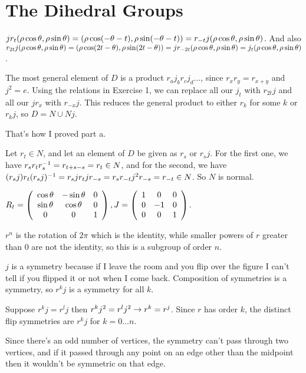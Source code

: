 \documentclass[11pt, oneside]{article}   	%
\begin{document}
\section{The Dihedral Groups}
\be
\item $jr_t(\rho\cos\theta, \rho\sin\theta) = (\rho\cos(-\theta - t), \rho\sin(-\theta - t)) = r_{-t}j(\rho\cos\theta, \rho\sin\theta)$. And also $r_{2t}j(\rho\cos\theta, \rho\sin\theta) = (\rho\cos(2t - \theta), \rho\sin(2t - \theta)) = jr_{-2t}(\rho\cos\theta, \rho\sin\theta) = j_t(\rho\cos\theta, \rho\sin\theta)$. 
\item \be
\item The most general element of $D$ is a product $r_aj_br_cj_d\ldots$, since $r_xr_y = r_{x + y}$ and $j^2 = e$. Using the relations in Exercise 1, we can replace all our $j_t$ with $r_{2t}j$ and all our $jr_x$ with $r_{-x}j$. This reduces the general product to either $r_k$ for some $k$ or $r_kj$, so $D = N \cup Nj$.
\item That's how I proved part a.
\item Let $r_t \in N$, and let an element of $D$ be given as $r_s$ or $r_sj$. For the first one, we have $r_sr_tr_s^{-1} = r_{t + s - s} = r_t \in N$, and for the second, we have $(r_sj)r_t(r_sj)^{-1} = r_sjr_tjr_{-s} = r_sr_{-t}j^2r_{-s} = r_{-t} \in N$. So $N$ is normal.
\ee 
\item $R_t =\left( \begin{array}{ccc} \cos\theta & -\sin\theta & 0 \\ \sin\theta & \cos\theta & 0 \\ 0 & 0 & 1 \end{array} \right), J = \left( \begin{array}{ccc} 1 & 0 & 0 \\ 0 & -1 & 0 \\ 0 & 0 & 1 \end{array} \right)$.
\item \be
\item $r^n$ is the rotation of $2\pi$ which is the identity, while smaller powers of $r$ greater than 0 are not the identity, so this is a subgroup of order $n$.
\item $j$ is a symmetry because if I leave the room and you flip over the figure I can't tell if you flipped it or not when I come back. Composition of symmetries is a symmetry, so $r^kj$ is a symmetry for all $k$.
\item Suppose $r^kj = r^lj$ then $r^kj^2 = r^lj^2 \rightarrow r^k = r^j$. Since $r$ has order $k$, the distinct flip symmetries are $r^kj$ for $k = 0 \ldots n$.
\ee
\item \be
\item Since there's an odd number of vertices, the symmetry can't pass through two vertices, and if it passed through any point on an edge other than the midpoint then it wouldn't be symmetric on that edge.
\end{document}
